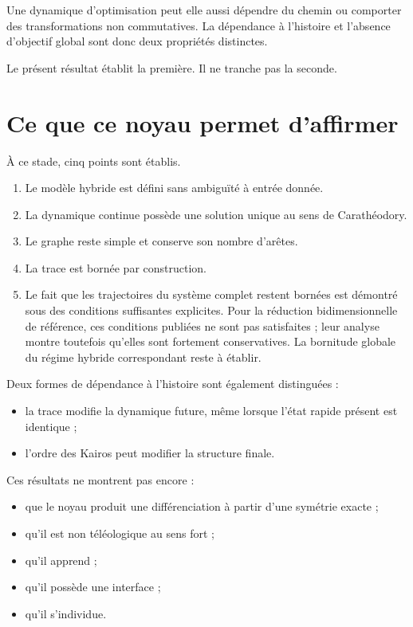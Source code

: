 Une dynamique d'optimisation peut elle aussi dépendre du chemin ou comporter des transformations non commutatives. La dépendance à l'histoire et l'absence d'objectif global sont donc deux propriétés distinctes.

Le présent résultat établit la première. Il ne tranche pas la seconde.

\chapter{Ce que ce noyau permet d'affirmer}\label{t1-ce-que-ce-noyau-permet-daffirmer}

À ce stade, cinq points sont établis.

\begin{enumerate}
\def\labelenumi{\arabic{enumi}.}
\tightlist
\item
  Le modèle hybride est défini sans ambiguïté à entrée donnée.
\item
  La dynamique continue possède une solution unique au sens de Carathéodory.
\item
  Le graphe reste simple et conserve son nombre d'arêtes.
\item
  La trace est bornée par construction.
\item
  Le fait que les trajectoires du système complet restent bornées est démontré sous des conditions suffisantes explicites. Pour la réduction bidimensionnelle de référence, ces conditions publiées ne sont pas satisfaites ; leur analyse montre toutefois qu'elles sont fortement conservatives. La bornitude globale du régime hybride correspondant reste à établir.
\end{enumerate}

Deux formes de dépendance à l'histoire sont également distinguées :

\begin{itemize}
\tightlist
\item
  la trace modifie la dynamique future, même lorsque l'état rapide
  présent est identique ;
\item
  l'ordre des Kairos peut modifier la structure finale.
\end{itemize}

Ces résultats ne montrent pas encore :

\begin{itemize}
\tightlist
\item
  que le noyau produit une différenciation à partir d'une symétrie
  exacte ;
\item
  qu'il est non téléologique au sens fort ;
\item
  qu'il apprend ;
\item
  qu'il possède une interface ;
\item
  qu'il s'individue.
\end{itemize}

